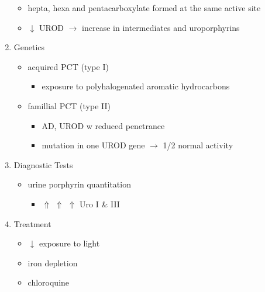 \documentclass[12pt]{scrartcl}
\begin{document}
\begin{enumerate}
\begin{itemize}
\item hepta, hexa and pentacarboxylate formed at the same active site
\item \(\downarrow\) UROD \(\to\) increase in intermediates and uroporphyrins
\end{itemize}
\item Genetics
\label{sec:org015f924}
\begin{itemize}
\item acquired PCT (type I)
\begin{itemize}
\item exposure to polyhalogenated aromatic hydrocarbons
\end{itemize}
\item famillial PCT (type II)
\begin{itemize}
\item AD, UROD w reduced penetrance
\item mutation in one UROD gene \(\to\) 1/2 normal activity
\end{itemize}
\end{itemize}
\item Diagnostic Tests
\label{sec:org85b9083}
\begin{itemize}
\item urine porphyrin quantitation
\begin{itemize}
\item \(\Uparrow\) \(\Uparrow\) \(\Uparrow\) Uro I \& III
\end{itemize}
\end{itemize}
\item Treatment
\label{sec:org7f65de2}
\begin{itemize}
\item \(\downarrow\) exposure to light
\item iron depletion
\item chloroquine
\end{itemize}
\end{enumerate}
\end{document}
